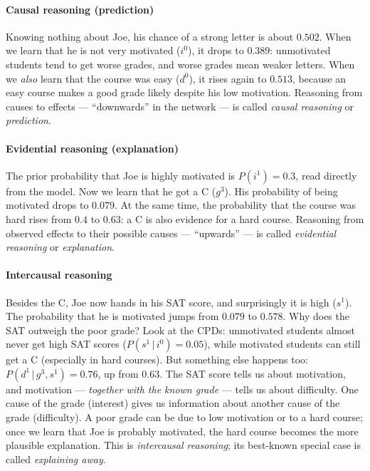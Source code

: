 \documentclass[11pt, oneside]{book}
\newcommand{\Prob}{\mathbb{P}}           %
\newcommand{\given}{\,\vert\,}           %
\begin{document}
\paragraph{Causal reasoning (prediction)} Knowing nothing about Joe, his chance
of a strong letter is about $0.502$. When we learn that he is not very
motivated ($i^0$), it drops to $0.389$: unmotivated students tend to get worse
grades, and worse grades mean weaker letters. When we \emph{also} learn that
the course was easy ($d^0$), it rises again to $0.513$, because an easy course
makes a good grade likely despite his low motivation. Reasoning from causes to
effects --- ``downwards'' in the network --- is called \emph{causal reasoning}
or \emph{prediction}.

\paragraph{Evidential reasoning (explanation)} The prior probability that Joe
is highly motivated is $P(i^1) = 0.3$, read directly from the model. Now we
learn that he got a C ($g^3$). His probability of being motivated drops to
$0.079$. At the same time, the probability that the course was hard rises from
$0.4$ to $0.63$: a C is also evidence for a hard course. Reasoning from
observed effects to their possible causes --- ``upwards'' --- is called
\emph{evidential reasoning} or \emph{explanation}.

\paragraph{Intercausal reasoning} Besides the C, Joe now hands in his SAT
score, and surprisingly it is high ($s^1$). The probability that he is
motivated jumps from $0.079$ to $0.578$. Why does the SAT outweigh the poor
grade? Look at the CPDs: unmotivated students almost never get high SAT scores
($P(s^1 \given i^0) = 0.05$), while motivated students can still get a C
(especially in hard courses). But something else happens too: $P(d^1 \given
g^3, s^1) = 0.76$, up from $0.63$. The SAT score tells us about motivation,
and motivation --- \emph{together with the known grade} --- tells us about
difficulty. One cause of the grade (interest) gives us information about
another cause of the grade (difficulty). A poor grade can be due to low
motivation or to a hard course; once we learn that Joe is probably motivated,
the hard course becomes the more plausible explanation. This is
\emph{intercausal reasoning}; its best-known special case is called
\emph{explaining away}.
\end{document}
